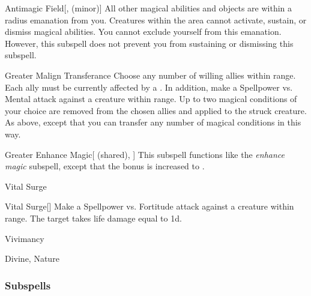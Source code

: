 \begin{ability}[\nth{7}]{Antimagic Field}[,  (minor)]
All other magical abilities and objects are  within a \areasmall radius emanation from you.
Creatures within the area cannot activate, sustain, or dismiss magical abilities.
You cannot exclude yourself from this emanation.
However, this subspell does not prevent you from sustaining or dismissing this subspell.
\end{ability}
\vspace{0.25em}


\begin{ability}[\nth{7}]{Greater Malign Transferance}
Choose any number of willing allies within \rngmed range.
Each ally must be currently affected by a  .
In addition, make a Spellpower vs. Mental attack against a creature within \rngmed range.
\hit Up to two magical conditions of your choice are removed from the chosen allies and applied to the struck creature.
\crit As above, except that you can transfer any number of magical conditions in this way.
\end{ability}
\vspace{0.25em}


\begin{ability}[\nth{8}]{Greater Enhance Magic}[ (shared), ]
This subspell functions like the \textit{enhance magic} subspell, except that the bonus is increased to .
\end{ability}
\vspace{0.25em}

\newpage
\begin{spellsection}{Vital Surge}


\begin{ability}{Vital Surge}[]
Make a Spellpower vs. Fortitude attack against a creature within \rngmed range.
\hit The target takes life damage equal to  \minus1d.
\end{ability}




 Vivimancy

 Divine, Nature
\end{spellsection}


\subsubsection{Subspells}


